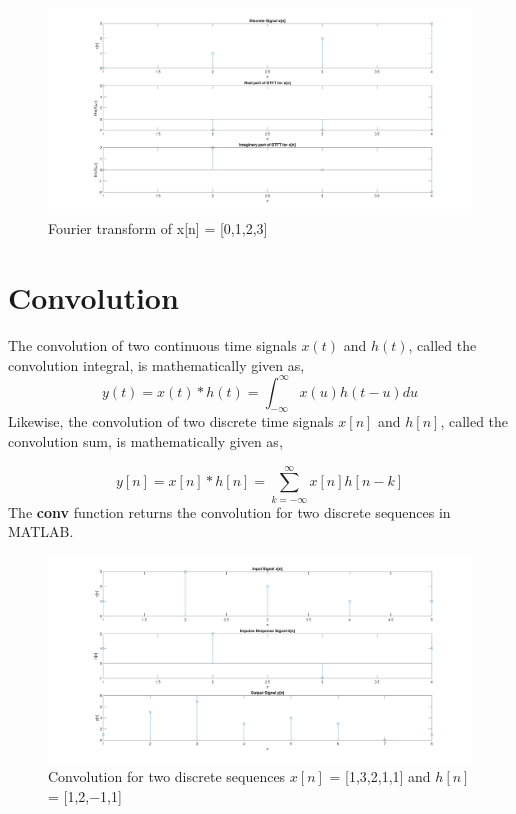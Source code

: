 \documentclass{article}
\begin{document}
\begin{figure}[H]
    \centering
    \includegraphics[scale=0.55,cframe=blue 0.5pt 3pt]{./FIG/FouTra}
    \caption{Fourier transform of x[n] = [0,1,2,3]}
\end{figure}


\section{Convolution}
The convolution of two continuous time signals $x(t)$ and $h(t)$, called the convolution integral, is mathematically given as,
$$
    y(t)=x(t)*h(t)=\int_{-\infty}^{\infty}x(u)h(t-u)du
$$
Likewise, the convolution of two discrete time signals $x[n]$ and $h[n]$, called the convolution sum, is mathematically given as,

$$
    y[n]=x[n]*h[n]=\sum_{k=-\infty}^{\infty} x[n]h[n-k]
$$
The \textbf{conv} function returns the convolution for two discrete sequences in MATLAB.


\begin{figure}[H]
    \centering
    \includegraphics[scale=0.55,cframe=blue 0.5pt 3pt]{./FIG/conv1}

    \caption{Convolution for two discrete sequences $x[n]$ = [1,3,2,1,1] and $h[n]$ = [1,2,−1,1]}
\end{figure}
\end{document}
